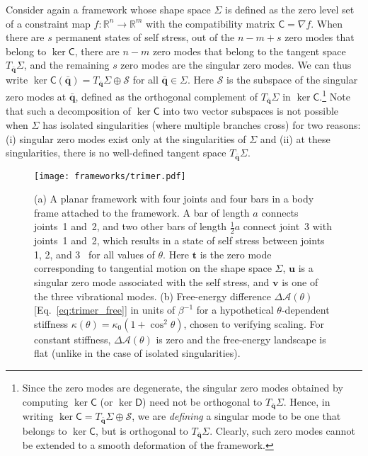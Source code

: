 Consider again a framework whose shape space $\Sigma$ is defined as the zero level set of a constraint map $f: \mathbb{R}^{n} \to \mathbb{R}^{m}$ with the compatibility matrix $\mathsf{C} = \nabla f$.
When there are $s$ permanent states of self stress, out of the $n - m + s$ zero modes that belong to $\ker\mathsf{C}$, there are $n-m$ zero modes that belong to the tangent space $T_{\bar{\bm{q}}}\Sigma$, and the remaining $s$ zero modes are the singular zero modes.
We can thus write $\ker\mathsf{C}(\bar{\bm{q}}) = T_{\bar{\bm{q}}}\Sigma \oplus \mathscr{S}$ for all $\bar{\bm{q}} \in \Sigma$.
Here $\mathscr{S}$ is the subspace of the singular zero modes at $\bar{\bm{q}}$, defined as the orthogonal complement of $T_{\bar{\bm{q}}}\Sigma$ in $\ker\mathsf{C}$.\footnote{Since the zero modes are degenerate, the singular zero modes obtained by computing $\ker\mathsf{C}$ (or $\ker\mathsf{D}$) need not be orthogonal to $T_{\bar{\bm{q}}}\Sigma$.  Hence, in writing $\ker\mathsf{C} = T_{\bar{\bm{q}}}\Sigma \oplus \mathscr{S}$, we are \emph{defining} a singular mode to be one that belongs to $\ker\mathsf{C}$, but is orthogonal to $T_{\bar{\bm{q}}}\Sigma$. Clearly, such zero modes cannot be extended to a smooth deformation of the framework.}
Note that such a decomposition of $\ker\mathsf{C}$ into two vector subspaces is not possible when $\Sigma$ has isolated singularities (where multiple branches cross) for two reasons: (i) singular zero modes exist only at the singularities of $\Sigma$ and (ii) at these singularities, there is no well-defined tangent space $T_{\bar{\bm{q}}}\Sigma$.
%
\begin{figure}
  \begin{center}
    \texttt{[image: frameworks/trimer.pdf]}
  \end{center}
  \caption{(a) A planar framework with four joints and four bars in a body frame attached to the framework.  A bar of length $a$ connects joints~1 and~2, and two other bars of length $\frac{1}{2}a$ connect joint~3 with joints~1 and~2, which results in a state of self stress between joints 1, 2, and 3~\cite{calladine1978} for all values of $\theta$. Here $\bm{t}$ is the zero mode corresponding to tangential motion on the shape space $\Sigma$, $\bm{u}$ is a singular zero mode associated with the self stress, and $\bm{v}$ is one of the three vibrational modes.  (b) Free-energy difference $\Delta\mathscr{A}(\theta)$ [Eq.~\eqref{eq:trimer_free}] in units of $\beta^{-1}$ for a hypothetical $\theta$-dependent stiffness $\kappa(\theta) = \kappa_{0}(1 + \cos^{2}{\theta})$, chosen to verifying scaling. For constant stiffness, $\Delta\mathscr{A}(\theta)$ is zero and the free-energy landscape is flat (unlike in the case of isolated singularities).}
  \label{fig:trimer}
\end{figure}


